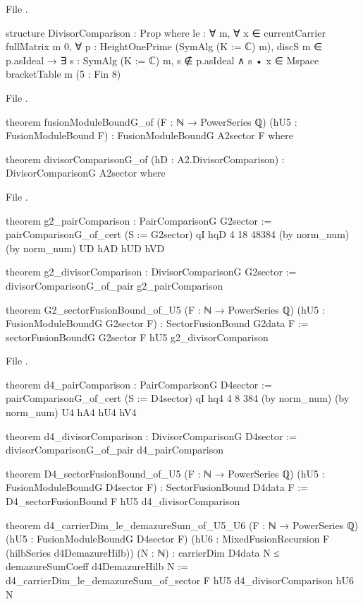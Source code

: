 \noindent File .
\begin{leancode}
structure DivisorComparison : Prop where
  le : ∀ m, ∀ x ∈ currentCarrier fullMatrix m 0, ∀ p : HeightOnePrime (SymAlg (K := ℂ) m),
    discS m ∈ p.asIdeal → ∃ s : SymAlg (K := ℂ) m, s ∉ p.asIdeal ∧
      s • x ∈ Mspace bracketTable m (5 : Fin 8)
\end{leancode}
\noindent File .
\begin{leancode}
theorem fusionModuleBoundG_of (F : ℕ → PowerSeries ℚ) (hU5 : FusionModuleBound F) :
    FusionModuleBoundG A2sector F where

theorem divisorComparisonG_of (hD : A2.DivisorComparison) : DivisorComparisonG A2sector where
\end{leancode}
\noindent File .
\begin{leancode}
theorem g2_pairComparison : PairComparisonG G2sector :=
  pairComparisonG_of_cert (S := G2sector) qI hqD 4 18 48384 (by norm_num) (by norm_num) UD hAD hUD hVD

theorem g2_divisorComparison : DivisorComparisonG G2sector :=
  divisorComparisonG_of_pair g2_pairComparison

theorem G2_sectorFusionBound_of_U5 (F : ℕ → PowerSeries ℚ) (hU5 : FusionModuleBoundG G2sector F) :
    SectorFusionBound G2data F :=
  sectorFusionBoundG G2sector F hU5 g2_divisorComparison
\end{leancode}
\noindent File .
\begin{leancode}
theorem d4_pairComparison : PairComparisonG D4sector :=
  pairComparisonG_of_cert (S := D4sector) qI hq4 4 8 384 (by norm_num) (by norm_num) U4 hA4 hU4 hV4

theorem d4_divisorComparison : DivisorComparisonG D4sector :=
  divisorComparisonG_of_pair d4_pairComparison

theorem D4_sectorFusionBound_of_U5 (F : ℕ → PowerSeries ℚ) (hU5 : FusionModuleBoundG D4sector F) :
    SectorFusionBound D4data F :=
  D4_sectorFusionBound F hU5 d4_divisorComparison

theorem d4_carrierDim_le_demazureSum_of_U5_U6 (F : ℕ → PowerSeries ℚ)
    (hU5 : FusionModuleBoundG D4sector F)
    (hU6 : MixedFusionRecursion F (hilbSeries d4DemazureHilb)) (N : ℕ) :
    carrierDim D4data N ≤ demazureSumCoeff d4DemazureHilb N :=
  d4_carrierDim_le_demazureSum_of_sector F hU5 d4_divisorComparison hU6 N
\end{leancode}
